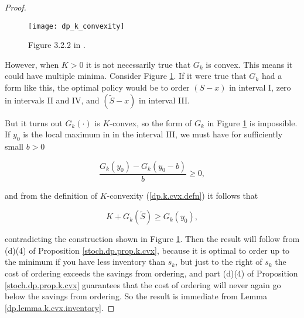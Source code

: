 \begin{proof}
%

\begin{figure}[htbp]
\begin{center}
\texttt{[image: dp\_k\_convexity]}
\caption{Figure 3.2.2 in \citet{v1_bertsekas2012dynamic}.}
\label{dp_k_convexity_fig}
\end{center}
\end{figure}

However, when \(K > 0\) it is not necessarily true that \(G_k\) is convex. This means it could have multiple minima. Consider Figure \ref{dp_k_convexity_fig}. If it were true that \(G_k\) had a form like this, the optimal policy would be to order \((S-x)\) in interval I, zero in intervals II and IV, and \((\tilde{S}-x)\) in interval III.

But it turns out \(G_k(\cdot)\) is \(K\)-convex, so the form of \(G_k\) in Figure \ref{dp_k_convexity_fig} is impossible. If \(y_0\) is the local maximum in in the interval III, we must have for sufficiently small \(b > 0\)

\[
\frac{G_k(y_0) - G_k(y_0 - b)}{b} \geq 0,
\]

and from the definition of \(K\)-convexity (\ref{dp.k.cvx.defn}) it follows that 

\[
K + G_k(\tilde{S}) \geq G_k(y_0),
\] 

contradicting the construction shown in Figure \ref{dp_k_convexity_fig}. Then the result will follow from (d)(4) of Proposition \ref{stoch.dp.prop.k.cvx}, because it is optimal to order up to the minimum if you have less inventory than \(s_k\), but just to the right of \(s_k\) the cost of ordering exceeds the savings from ordering, and part (d)(4) of Proposition \ref{stoch.dp.prop.k.cvx} guarantees that the cost of ordering will never again go below the savings from ordering. So the result is immediate from Lemma \ref{dp.lemma.k.cvx.inventory}.












\end{proof}

